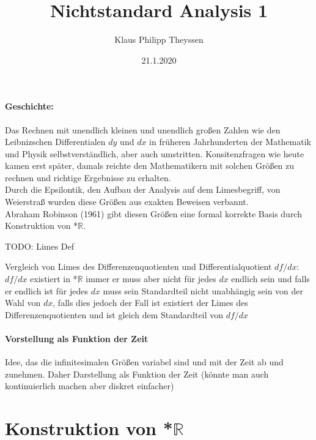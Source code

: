 \documentclass[a4paper]{article}
\title{Nichtstandard Analysis 1}
\date{21.1.2020}
\author{Klaus Philipp Theyssen}
\begin{document}
\maketitle


\paragraph{Geschichte:}  
Das Rechnen mit unendlich kleinen und unendlich großen Zahlen wie den Leibnizschen Differentialen
$ dy $ und $ dx $ in früheren Jahrhunderten der Mathematik und Physik selbstverständlich, 
aber auch umstritten. Konsitenzfragen wie heute kamen erst später, damals reichte den Mathematikern
mit solchen Größen zu rechnen und richtige Ergebnisse zu erhalten. \\
Durch die Epsilontik, den Aufbau der Analysis auf dem Limesbegriff, von Weierstraß wurden diese Größen aus 
exakten Beweisen verbannt. \\ 
Abraham Robinson (1961) gibt diesen Größen eine formal korrekte Basis durch Konstruktion von *$\mathbb{R}$.

\bigskip
TODO: Limes Def

\bigskip
Vergleich von Limes des Differenzenquotienten und Differentialquotient $ df/dx $:
$ df/dx $ existiert in *$\mathbb{R} $ immer er muss aber nicht für jedes $ dx $ endlich sein und falls er endlich ist 
für jedes $ dx $ muss sein Standardteil nicht unabhängig sein von der Wahl von $ dx $, falls dies jedoch der Fall ist 
existiert der Limes des Differenzenquotienten und ist gleich dem Standardteil von $ df/dx $ 

\paragraph{Vorstellung als Funktion der Zeit} Idee, das die infinitesimalen Größen variabel sind und mit der Zeit ab und zunehmen.
Daher Darstellung als Funktion der Zeit (könnte man auch kontinuierlich machen aber diskret einfacher)

\section{Konstruktion von *$\mathbb{R}$}
\end{document}
